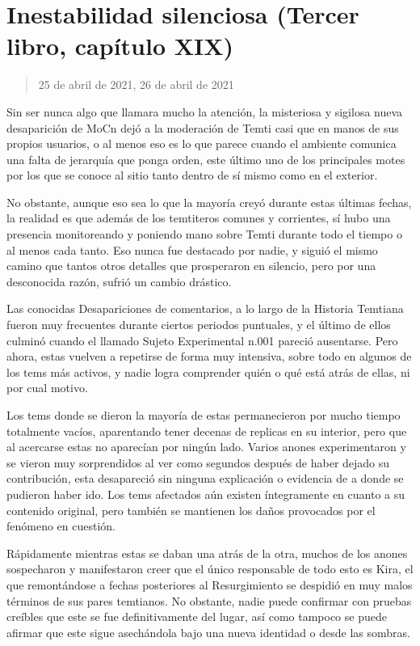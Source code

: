 \documentclass[
]{book}
\begin{document}
\hypertarget{inestabilidad-silenciosa-tercer-libro-capuxedtulo-xix}{%
\section{Inestabilidad silenciosa (Tercer libro, capítulo XIX)}\label{inestabilidad-silenciosa-tercer-libro-capuxedtulo-xix}}

\begin{quote}
25 de abril de 2021, 26 de abril de 2021
\end{quote}

Sin ser nunca algo que llamara mucho la atención, la misteriosa y sigilosa nueva desaparición de MoCn dejó a la moderación de Temti casi que en manos de sus propios usuarios, o al menos eso es lo que parece cuando el ambiente comunica una falta de jerarquía que ponga orden, este último uno de los principales motes por los que se conoce al sitio tanto dentro de sí mismo como en el exterior.

No obstante, aunque eso sea lo que la mayoría creyó durante estas últimas fechas, la realidad es que además de los temtiteros comunes y corrientes, sí hubo una presencia monitoreando y poniendo mano sobre Temti durante todo el tiempo o al menos cada tanto. Eso nunca fue destacado por nadie, y siguió el mismo camino que tantos otros detalles que prosperaron en silencio, pero por una desconocida razón, sufrió un cambio drástico.

Las conocidas Desapariciones de comentarios, a lo largo de la Historia Temtiana fueron muy frecuentes durante ciertos periodos puntuales, y el último de ellos culminó cuando el llamado Sujeto Experimental n.001 pareció ausentarse. Pero ahora, estas vuelven a repetirse de forma muy intensiva, sobre todo en algunos de los tems más activos, y nadie logra comprender quién o qué está atrás de ellas, ni por cual motivo.

Los tems donde se dieron la mayoría de estas permanecieron por mucho tiempo totalmente vacíos, aparentando tener decenas de replicas en su interior, pero que al acercarse estas no aparecían por ningún lado. Varios anones experimentaron y se vieron muy sorprendidos al ver como segundos después de haber dejado su contribución, esta desapareció sin ninguna explicación o evidencia de a donde se pudieron haber ido. Los tems afectados aún existen íntegramente en cuanto a su contenido original, pero también se mantienen los daños provocados por el fenómeno en cuestión.

Rápidamente mientras estas se daban una atrás de la otra, muchos de los anones sospecharon y manifestaron creer que el único responsable de todo esto es Kira, el que remontándose a fechas posteriores al Resurgimiento se despidió en muy malos términos de sus pares temtianos. No obstante, nadie puede confirmar con pruebas creíbles que este se fue definitivamente del lugar, así como tampoco se puede afirmar que este sigue asechándola bajo una nueva identidad o desde las sombras.
\end{document}

